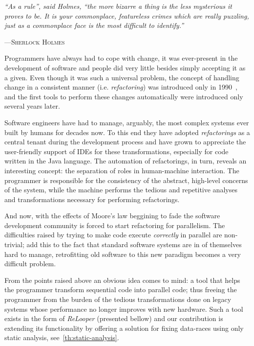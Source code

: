 \graphicspath{{content/introduction/figures/}}

\epigraph{\textit{``As a rule'', said Holmes, ``the more bizarre a thing is the
less mysterious it proves to be. It is your commonplace, featureless crimes which are
really puzzling, just as a commonplace face is the most difficult to
identify.''}}{---\textsc{Sherlock Holmes}} 

Programmers have always had to cope with change, it was ever-present in the
development of software and people did very little besides simply accepting it
as a given. Even though it was such a universal problem, the concept of handling
change in a consistent manner (i.e. \emph{refactoring}) was introduced only in
1990~\cite{first-ref-mention}, and the first tools to perform these changes
automatically were introduced only several years later.

Software engineers have had to manage, arguably, the most complex systems ever
built by humans for decades now. To this end they have adopted
\emph{refactorings} as a central tenant during the development process and have
grown to appreciate the user-friendly support of IDEs for these transformations,
especially for code written in the Java language. The automation of
refactorings, in turn, reveals an interesting concept: the separation of roles in
human-machine interaction. The programmer is responsible for the consistency of
the abstract, high-level concerns of the system, while the machine performs the
tedious and repetitive analyses and transformations necessary for performing
refactorings.

And now, with the effects of Moore's law beggining to fade the software
development community is forced to start refactoring for parallelism. The
difficulties raised by trying to make code execute \emph{correctly} in parallel
are non-trivial; add this to the fact that standard software systems are in of
themselves hard to manage, retrofitting old software to this new paradigm
becomes a very difficult problem.


From the points raised above an obvious idea comes to mind: a tool that helps
the programmer transform sequential code into parallel code; thus freeing the
programmer from the burden of the tedious transformations done on legacy systems
whose performance no longer improves with new hardware. Such a tool exists in
the form of \emph{ReLooper} (presented bellow) and our contribution is extending
its functionality by offering a solution for fixing data-races using only static
analysis, see~\ref{th:static-analysis}.

